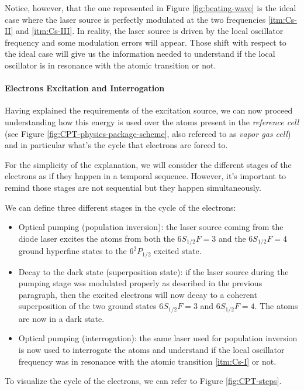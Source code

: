 Notice, however, that the one represented in Figure \ref{fig:beating-wave} is the ideal case where the laser source is perfectly modulated at the two frequencies \ref{itm:Cs-II} and \ref{itm:Cs-III}.
In reality, the laser source is driven by the local oscillator frequency and some modulation errors will appear.
Those shift with respect to the ideal case will give us the information needed to understand if the local oscillator is in resonance with the atomic transition or not.

\paragraph{Electrons Excitation and Interrogation}

Having explained the requirements of the excitation source, we can now proceed understanding how this energy is used over the atoms present in the \textit{reference cell} (see Figure \ref{fig:CPT-physics-package-scheme}, also refereed to as \textit{vapor gas cell}) and in particular what's the cycle that electrons are forced to.

For the simplicity of the explanation, we will consider the different stages of the electrons as if they happen in a temporal sequence.
However, it's important to remind those stages are not sequential but they happen simultaneously.

We can define three different stages in the cycle of the electrons:

\begin{itemize}
    \item Optical pumping (population inversion): the laser source coming from the diode laser excites the atoms from both the $6S_{1/2} F=3$ and the $6S_{1/2} F=4$ ground hyperfine states to the $6^2P_{1/2}$ excited state.
    \item Decay to the dark state (superposition state): if the laser source during the pumping stage wss modulated properly as described in the previous paragraph, then the excited electrons will now decay to a coherent superposition of the two ground states $6S_{1/2} F=3$ and $6S_{1/2} F=4$. The atoms are now in a dark state.
    \item Optical pumping (interrogation): the same laser used for population inversion is now used to interrogate the atoms and understand if the local oscillator frequency was in resonance with the atomic transition \ref{itm:Cs-I} or not.
\end{itemize}

To visualize the cycle of the electrons, we can refer to Figure \ref{fig:CPT-steps}.

